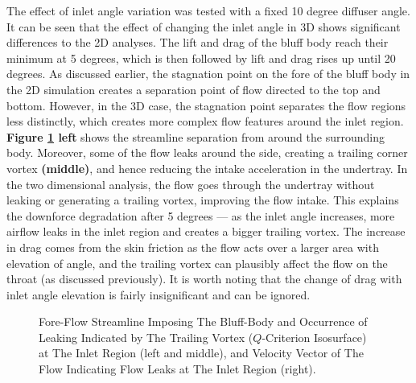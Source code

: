 \noindent The effect of inlet angle variation was tested with a fixed 10 degree diffuser angle. It can be seen that the effect of changing the inlet angle in 3D shows significant differences to the 2D analyses. The lift and drag of the bluff body reach their minimum at 5 degrees, which is then followed by lift and drag rises up until 20 degrees. As discussed earlier, the stagnation point on the fore of the bluff body in the 2D simulation creates a separation point of flow directed to the top and bottom. However, in the 3D case, the stagnation point separates the flow regions less distinctly, which creates more complex flow features around the inlet region. \textbf{Figure \ref{fig:3D_OF_INLET_COMPARE} left} shows the streamline separation from around the surrounding body. Moreover, some of the flow leaks around the side, creating a trailing corner vortex \textbf{(middle)}, and hence reducing the intake acceleration in the undertray. In the two dimensional analysis, the flow goes through the undertray without leaking or generating a trailing vortex, improving the flow intake. This explains the downforce degradation after 5 degrees --- as the inlet angle increases, more airflow leaks in the inlet region and creates a bigger trailing vortex. The increase in drag comes from the skin friction as the flow acts over a larger area with elevation of angle, and the trailing vortex can plausibly affect the flow on the throat (as discussed previously). It is worth noting that the change of drag with inlet angle elevation is fairly insignificant and can be ignored.

\begin{figure}[!htb]
    \centering
    \noindent{}
    \caption{Fore-Flow Streamline Imposing The Bluff-Body and Occurrence of Leaking Indicated by The Trailing Vortex ($Q$-Criterion Isosurface) at The Inlet Region (left and middle), and Velocity Vector of The Flow Indicating Flow Leaks at The Inlet Region (right).} 
    \label{fig:3D_OF_INLET_COMPARE}
\end{figure}


